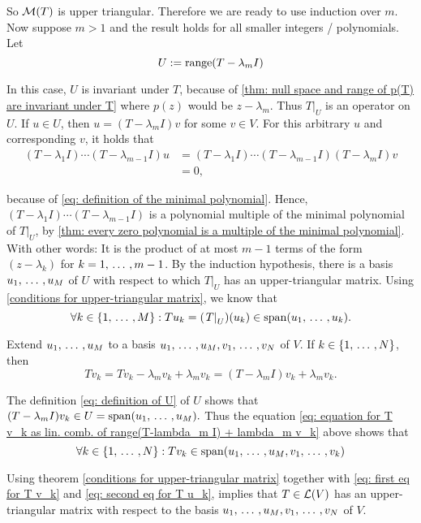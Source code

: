 \begin{prf}
  So $\mathcal{M}(T)$ is upper triangular. Therefore we are ready to use induction over $m$.
  Now suppose $m > 1$ and the result holds for all smaller integers / polynomials. Let
  \begin{equation}
    \label{eq: definition of U}
    U := \operatorname{range}(T - \lambda_m I)
  \end{equation}

  In this case, $U$ is invariant under $T$, because of \ref{thm: null space and range of p(T) are invariant under T} where $p(z)$ would be $z-\lambda_m$. Thus $\left. T \right |_{U}$ is an operator on $U$.
  If $u \in U$, then $u=(T - \lambda_m I) v$ for some $v \in V$. For this arbitrary $u$ and corresponding $v$, it holds that
  \begin{align}
    (T-\lambda_1 I) \cdots (T-\lambda_{m-1}I)u
    &=(T-\lambda_1I)\cdots(T-\lambda_{m-1}I)(T-\lambda_mI)v \\
    &=0,
  \end{align}

  because of \eqref{eq: definition of the minimal polynomial}. Hence, $(T-\lambda_1 I) \cdots (T-\lambda_{m-1}I)$ is a polynomial multiple of the minimal polynomial of $\left. T \right |_{U}$, by \ref{thm: every zero polynomial is a multiple of the minimal polynomial}. With other words: It is the product of at most $m-1$ terms of the form $(z-\lambda_k)$ for $k = 1, {\, \ldots \,\,}, m-1$.
  By the induction hypothesis, there is a basis $u_1, {\, \ldots \,\,}, u_M$ of $U$ with respect to which $\left. T \right |_{U}$ has an upper-triangular matrix. Using \ref{conditions for upper-triangular matrix}, we know that
  \begin{equation}
    \label{eq: first eq for T v_k}
    \forall k \in \{ 1, {\, \ldots \,\,}, M \}:
    T u_k = ( \left. T \right|_{U})(u_k)
    \in \operatorname{span} (u_1, {\, \ldots \,\,}, u_k).
  \end{equation}

  Extend $u_1, {\, \ldots \,\,}, u_M$ to a basis $u_1, {\, \ldots \,\,}, u_M, v_1, {\, \ldots \,\,}, v_N$ of $V$. If $k \in \{1, {\, \ldots \,\,}, N\}$, then
  \begin{equation}
    \label{eq: equation for T v_k as lin. comb. of range(T-lambda_m I) + lambda_m v_k}
    T v_k = T v_k - \lambda_m v_k + \lambda_m v_k = (T-\lambda_m I)v_k + \lambda_m v_k.
  \end{equation}

  The definition \eqref{eq: definition of U} of $U$ shows that $(T-\lambda_mI) v_k \in U = \operatorname{span} (u_1, {\, \ldots \,\,}, u_M).$ Thus the equation \eqref{eq: equation for T v_k as lin. comb. of range(T-lambda_m I) + lambda_m v_k} above shows that
  \begin{equation}
    \label{eq: second eq for T u_k}
    \forall k \in \{ 1, {\, \ldots \,\,}, N \}: T v_k \in \operatorname{span} (u_1, {\, \ldots \,\,}, u_M, v_1, {\, \ldots \,\,}, v_k)
  \end{equation}

  Using theorem \ref{conditions for upper-triangular matrix} together with \eqref{eq: first eq for T v_k} and \eqref{eq: second eq for T u_k}, implies that $T \in \mathcal{L}(V)$ has an upper-triangular matrix with respect to the basis $u_1, {\, \ldots \,\,}, u_M, v_1, {\, \ldots \,\,}, v_N$ of $V$.
\end{prf}


